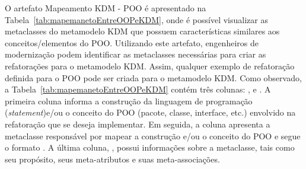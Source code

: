 O artefato Mapeamento KDM - POO é apresentado na Tabela~\ref{tab:mapemanetoEntreOOPeKDM}, onde é possível visualizar as metaclasses do metamodelo KDM que possuem características similares aos conceitos/elementos do POO. Utilizando este artefato, engenheiros de modernização podem identificar as metaclasses necessárias para criar as refatorações para o metamodelo KDM. Assim, qualquer exemplo de refatoração definida para o POO pode ser criada para o metamodelo KDM. Como observado, a Tabela~\ref{tab:mapemanetoEntreOOPeKDM} contém três colunas: ,  e . A primeira coluna informa a construção da linguagem de programação (\textit{statement})e/ou o conceito do POO (pacote, classe, interface, etc.) envolvido na refatoração que se deseja implementar. Em seguida, a coluna  apresenta a metaclasse responsável por mapear a construção e/ou o conceito do POO e segue o formato . A última coluna, , possui informações sobre a metaclasse, tais como seu propósito, seus meta-atributos e suas meta-associações.
